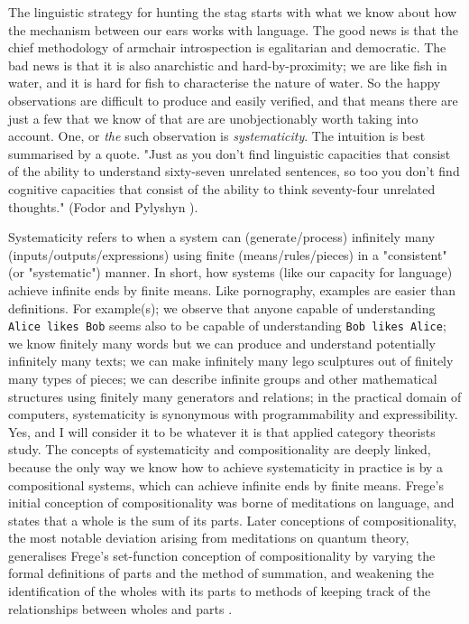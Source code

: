  The linguistic strategy for hunting the stag starts with what we know about how the mechanism between our ears works with language. The good news is that the chief methodology of armchair introspection is egalitarian and democratic. The bad news is that it is also anarchistic and hard-by-proximity; we are like fish in water, and it is hard for fish to characterise the nature of water. So the happy observations are difficult to produce and easily verified, and that means there are just a few that we know of that are are unobjectionably worth taking into account. One, or \emph{the} such observation is \emph{systematicity}. The intuition is best summarised by a quote. "Just as you don't find linguistic capacities that consist of the ability to understand sixty-seven unrelated sentences, so too you don't find cognitive capacities that consist of the ability to think seventy-four unrelated thoughts." (Fodor and Pylyshyn \citep{fodorConnectionismCognitiveArchitecture1988}).

 Systematicity refers to when a system can (generate/process) infinitely many (inputs/outputs/expressions) using finite (means/rules/pieces) in a "consistent" (or "systematic") manner. In short, how systems (like our capacity for language) achieve infinite ends by finite means. Like pornography, examples are easier than definitions. For example(s); we observe that anyone capable of understanding \texttt{Alice likes Bob} seems also to be capable of understanding \texttt{Bob likes Alice}; we know finitely many words but we can produce and understand potentially infinitely many texts; we can make infinitely many lego sculptures out of finitely many types of pieces; we can describe infinite groups and other mathematical structures using finitely many generators and relations; in the practical domain of computers, systematicity is synonymous with programmability and expressibility.\\

 Yes, and I will consider it to be whatever it is that applied category theorists study. The concepts of systematicity and compositionality are deeply linked, because the only way we know how to achieve systematicity in practice is by a compositional systems, which can achieve infinite ends by finite means. Frege's initial conception of compositionality \citep{fregegottlobSelbstConcreteDinge1884} was borne of meditations on language, and states that a whole is the sum of its parts. Later conceptions of compositionality, the most notable deviation arising from meditations on quantum theory, generalises Frege's set-function conception of compositionality by varying the formal definitions of parts and the method of summation, and weakening the identification of the wholes with its parts to methods of keeping track of the relationships between wholes and parts \citep{coeckeCompositionalityWeSee2021}.

